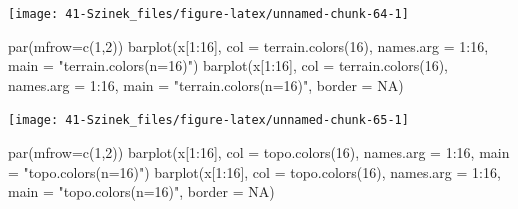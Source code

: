 \documentclass[
]{book}
\newenvironment{Shaded}{\begin{snugshade}}{\end{snugshade}}
\newcommand{\AttributeTok}[1]{\textcolor[rgb]{0.77,0.63,0.00}{#1}}
\newcommand{\ConstantTok}[1]{\textcolor[rgb]{0.00,0.00,0.00}{#1}}
\newcommand{\DecValTok}[1]{\textcolor[rgb]{0.00,0.00,0.81}{#1}}
\newcommand{\FunctionTok}[1]{\textcolor[rgb]{0.00,0.00,0.00}{#1}}
\newcommand{\NormalTok}[1]{#1}
\newcommand{\SpecialCharTok}[1]{\textcolor[rgb]{0.00,0.00,0.00}{#1}}
\newcommand{\StringTok}[1]{\textcolor[rgb]{0.31,0.60,0.02}{#1}}
\begin{document}
\begin{center}\texttt{[image: 41-Szinek\_files/figure-latex/unnamed-chunk-64-1]} \end{center}

\begin{Shaded}
\begin{Highlighting}[]
\FunctionTok{par}\NormalTok{(}\AttributeTok{mfrow=}\FunctionTok{c}\NormalTok{(}\DecValTok{1}\NormalTok{,}\DecValTok{2}\NormalTok{))}
\FunctionTok{barplot}\NormalTok{(x[}\DecValTok{1}\SpecialCharTok{:}\DecValTok{16}\NormalTok{], }\AttributeTok{col =} \FunctionTok{terrain.colors}\NormalTok{(}\DecValTok{16}\NormalTok{), }\AttributeTok{names.arg =} \DecValTok{1}\SpecialCharTok{:}\DecValTok{16}\NormalTok{, }\AttributeTok{main =} \StringTok{"terrain.colors(n=16)"}\NormalTok{)}
\FunctionTok{barplot}\NormalTok{(x[}\DecValTok{1}\SpecialCharTok{:}\DecValTok{16}\NormalTok{], }\AttributeTok{col =} \FunctionTok{terrain.colors}\NormalTok{(}\DecValTok{16}\NormalTok{), }\AttributeTok{names.arg =} \DecValTok{1}\SpecialCharTok{:}\DecValTok{16}\NormalTok{, }\AttributeTok{main =} \StringTok{"terrain.colors(n=16)"}\NormalTok{, }\AttributeTok{border =} \ConstantTok{NA}\NormalTok{)}
\end{Highlighting}
\end{Shaded}

\begin{center}\texttt{[image: 41-Szinek\_files/figure-latex/unnamed-chunk-65-1]} \end{center}

\begin{Shaded}
\begin{Highlighting}[]
\FunctionTok{par}\NormalTok{(}\AttributeTok{mfrow=}\FunctionTok{c}\NormalTok{(}\DecValTok{1}\NormalTok{,}\DecValTok{2}\NormalTok{))}
\FunctionTok{barplot}\NormalTok{(x[}\DecValTok{1}\SpecialCharTok{:}\DecValTok{16}\NormalTok{], }\AttributeTok{col =} \FunctionTok{topo.colors}\NormalTok{(}\DecValTok{16}\NormalTok{), }\AttributeTok{names.arg =} \DecValTok{1}\SpecialCharTok{:}\DecValTok{16}\NormalTok{, }\AttributeTok{main =} \StringTok{"topo.colors(n=16)"}\NormalTok{)}
\FunctionTok{barplot}\NormalTok{(x[}\DecValTok{1}\SpecialCharTok{:}\DecValTok{16}\NormalTok{], }\AttributeTok{col =} \FunctionTok{topo.colors}\NormalTok{(}\DecValTok{16}\NormalTok{), }\AttributeTok{names.arg =} \DecValTok{1}\SpecialCharTok{:}\DecValTok{16}\NormalTok{, }\AttributeTok{main =} \StringTok{"topo.colors(n=16)"}\NormalTok{, }\AttributeTok{border =} \ConstantTok{NA}\NormalTok{)}
\end{Highlighting}
\end{Shaded}
\end{document}
